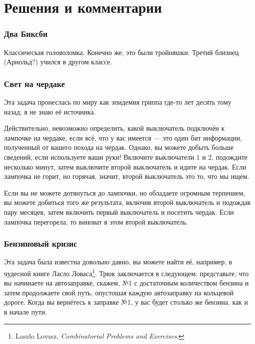 \section*{Решения и комментарии}

\subsubsection*{Два Биксби} %

Классическая головоломка.
Конечно же, это были тройняшки.
Третий близнец (Арнольд?) учился в другом классе.

\subsubsection*{Свет на чердаке} %

Эта задача пронеслась по миру как эпидемия гриппа где-то лет десять тому назад; я не знаю её источника.

Действительно, невозможно определить, какой выключатель подключён к лампочке на чердаке, если всё, что у вас имеется --- это один бит информации, полученный от вашего похода на чердак.
Однако, вы можете добыть больше сведений, если используете ваши руки!
Включите выключатели 1 и 2, подождите несколько минут, затем выключите второй выключатель и идите на чердак.
Если лампочка не горит, но горячая, значит, второй выключатель это то, что мы ищем.
\heart

Если вы не можете дотянуться до лампочки, но обладаете огромным терпением, вы можете добиться того же результата, включив второй выключатель и подождав пару месяцев, затем включить первый выключатель и посетить чердак.
Если лампочка перегорела, то виноват в этом второй выключатель.

\subsubsection*{Бензиновый кризис} %

Эта задача была известна довольно давно, вы можете найти её, например, в чудесной книге Ласло Ловаса\footnote{Laszlo Lovasz, \emph{Combinatorial Problems and Exercises}.}.
Трюк заключается в следующем:
представьте, что вы начинаете на автозаправке, скажем, №1 с достаточным количеством бензина и затем продолжаете свой путь, опустошая каждую автозаправку на кольцевой дороге.
Когда вы вернётесь к заправке №1, 
у вас будет столько же бензина, как и в начале пути.

